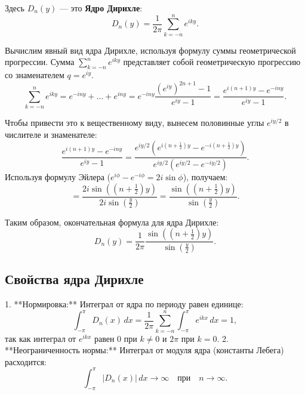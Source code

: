 \documentclass[12pt,a4paper,openany]{book}
\begin{document}
Здесь $D_n(y)$ — это \textbf{Ядро Дирихле}:
$$ D_n(y) = \frac{1}{2\pi} \sum_{k=-n}^{n} e^{iky}. $$

Вычислим явный вид ядра Дирихле, используя формулу суммы геометрической прогрессии.
Сумма $\sum_{k=-n}^{n} e^{iky}$ представляет собой геометрическую прогрессию со знаменателем $q = e^{iy}$.
$$ \sum_{k=-n}^{n} e^{iky} = e^{-iny} + \dots + e^{iny} = e^{-iny} \frac{(e^{iy})^{2n+1} - 1}{e^{iy} - 1} = \frac{e^{i(n+1)y} - e^{-iny}}{e^{iy} - 1}. $$

Чтобы привести это к вещественному виду, вынесем половинные углы $e^{iy/2}$ в числителе и знаменателе:
$$ \frac{e^{i(n+1)y} - e^{-iny}}{e^{iy} - 1} = \frac{e^{iy/2} \left( e^{i(n+\frac{1}{2})y} - e^{-i(n+\frac{1}{2})y} \right)}{e^{iy/2} \left( e^{iy/2} - e^{-iy/2} \right)}. $$
Используя формулу Эйлера ($e^{i\phi} - e^{-i\phi} = 2i\sin\phi$), получаем:
$$ = \frac{2i \sin\left( \left(n + \frac{1}{2}\right)y \right)}{2i \sin\left(\frac{y}{2}\right)} = \frac{\sin\left( \left(n + \frac{1}{2}\right)y \right)}{\sin\left(\frac{y}{2}\right)}. $$

Таким образом, окончательная формула для ядра Дирихле:
$$ D_n(y) = \frac{1}{2\pi} \frac{\sin\left( \left(n + \frac{1}{2}\right)y \right)}{\sin\left(\frac{y}{2}\right)}. $$

\begin{center}
\end{center}

\subsection{Свойства ядра Дирихле}
1.  **Нормировка:** Интеграл от ядра по периоду равен единице:
    $$ \int_{-\pi}^{\pi} D_n(x) \, dx = \frac{1}{2\pi} \sum_{k=-n}^{n} \int_{-\pi}^{\pi} e^{ikx} \, dx = 1, $$
    так как интеграл от $e^{ikx}$ равен 0 при $k \neq 0$ и $2\pi$ при $k=0$.
2.  **Неограниченность нормы:** Интеграл от модуля ядра (константы Лебега) расходится:
    $$ \int_{-\pi}^{\pi} |D_n(x)| \, dx \to \infty \quad \text{при} \quad n \to \infty. $$
\end{document}
